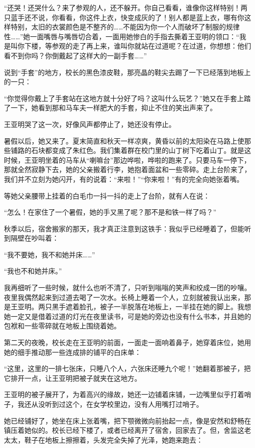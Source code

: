 \par “还哭！还哭什么？来了参观的人，还不躲开。你自己看看，谁像你这样特别！两只蓝手还不说，你看看，你这件上衣，快变成灰的了！别人都是蓝上衣，哪有你这样特别，太旧的衣裳颜色是不整齐的……不能因为你一个人而破坏了制服的规律性……”她一面嘴唇与嘴唇切合着，一面用她惨白的手指去撕着王亚明的领口：“我是叫你下楼，等参观的走了再上来，谁叫你就站在过道呢？在过道，你想想：他们看不到你吗？你倒戴起了这样大的一副手套……”
\par 说到“手套”的地方，校长的黑色漆皮鞋，那亮晶的鞋尖去踢了一下已经落到地板上的一只：
\par “你觉得你戴上了手套站在这地方就十分好了吗？这叫什么玩艺？”她又在手套上踏了一下，她看到那和马车夫一样肥大的手套，抑止不住的笑出声来了。
\par 王亚明哭了这一次，好像风声都停止了，她还没有停止。
\par 暑假以后，她又来了。夏末简直和秋天一样凉爽，黄昏以前的太阳染在马路上使那些铺路的石块都变成了朱红色。我们集着群在校门里的山丁树下吃着山丁。就是这时候，王亚明坐着的马车从“喇嘛台”那边哗啦，哗啦的跑来了。只要马车一停下，那就全然寂静下去，她的父亲搬着行李，她抱着面盆和一些零碎。走上台阶来了，我们并不立刻为她闪开，有的说着：“来啦！”“你来啦！”有的完全向她张着嘴。
\par 等她父亲腰带上挂着的白毛巾一抖一抖的走上了台阶，就有人在说：
\par “怎么！在家住了一个暑假，她的手又黑了呢？那不是和铁一样了吗？”
\par 秋季以后，宿舍搬家的那天，我才真正注意到这铁手：我似乎已经睡着了，但能听到隔壁在吵叫着：
\par “我不要她，我不和她并床……”
\par “我也不和她并床。”
\par 我再细听了一些时候，就什么也听不清了，只听到嗡嗡的笑声和绞成一团的吵嚷。夜里我偶然起来到过道去喝了一次水。长椅上睡着一个人，立刻就被我认出来，那是王亚明。两只黑手遮着脸孔，被子一半脱落在地板上，一半挂在她的脚上。我想她一定又是借着过道的灯光在夜里读书，可是她的旁边也没有什么书本，并且她的包袱和一些零碎就在地板上围绕着她。
\par 第二天的夜晚，校长走在王亚明的前面，一面走一面响着鼻子，她穿着床位，她用她的细手推动那一些连成排的铺平的白床单：
\par “这里，这里的一排七张床，只睡八个人，六张床还睡九个呢！”她翻着那被子，把它排开一点，让王亚明把被子就夹在这地方。
\par 王亚明的被子展开了，为着高兴的缘故，她还一边铺着床铺，一边嘴里似乎打着哨子，我还从没听到过这个，在女学校里边，没有人用嘴打过哨子。
\par 她已经铺好了，她坐在床上张着嘴，把下颚微微向前抬起一点，像是安然和舒畅在镇压着她似的。校长已经下楼了，或者已经离开了宿舍，回家去了。但，舍监这老太太，鞋子在地板上擦擦着，头发完全失掉了光泽，她跑来跑去：
